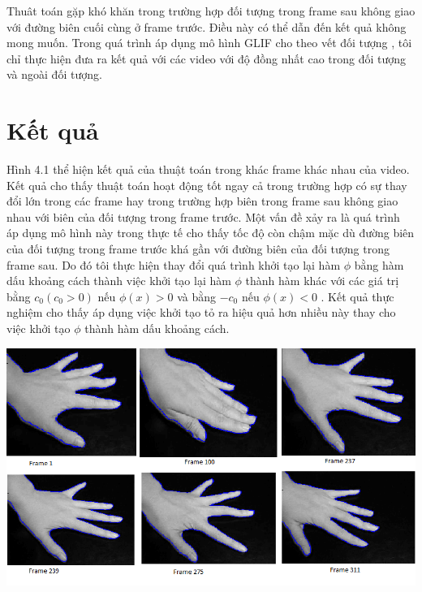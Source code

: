 \documentclass[14pt,oneside,a4paper]{extreport}
\begin{document}
Thuât toán gặp khó khăn trong trường hợp đối tượng trong frame sau không giao với đường biên cuối cùng ở frame trước. Điều này có thể dẫn đến kết quả không mong muốn. Trong quá trình áp dụng mô hình GLIF cho theo vết đối tượng  , tôi chỉ thực hiện đưa ra kết quả với các video với độ đồng nhất cao trong đối tượng và ngoài đối tượng.  
\section{Kết quả}
Hình 4.1 thể hiện kết quả của thuật toán trong khác frame khác nhau của video. Kết quả cho thấy thuật toán hoạt động tốt ngay cả trong trường hợp có sự thay đổi lớn trong các frame hay trong trường hợp biên trong frame sau không giao nhau với biên của đối tượng trong frame trước. Một vấn đề xảy ra là quá trình áp dụng  mô hình này  trong thực tế cho thấy tốc độ còn chậm mặc dù đường biên của đối tượng trong frame trước khá gần với đường biên của đối tượng trong frame sau. Do đó tôi thực hiện thay đổi quá trình khởi tạo lại hàm $\phi$ bằng hàm dấu khoảng cách thành việc khởi tạo lại hàm $\phi$ thành hàm khác với các giá trị bằng $c_0(c_0>0)$ nếu $\phi(x)>0$ và bằng $-c_0$ nếu $\phi(x)<0$ . Kết quả thực nghiệm cho thấy áp dụng việc khởi tạo  tỏ ra hiệu quả hơn nhiều này thay cho việc khởi tạo $\phi$ thành  hàm dấu khoảng cách.
\begin{center}
\includegraphics[scale=0.5]{figure/video1.png}
\end{center}   
\end{document}
